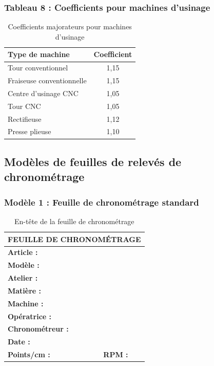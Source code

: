 \documentclass[a4paper,12pt]{article}
\begin{document}
\subsubsection{Tableau 8 : Coefficients pour machines d'usinage}

\begin{table}[ht]
\centering
\begin{tabular}{|l|c|}
\hline
\textbf{Type de machine} & \textbf{Coefficient} \\
\hline
Tour conventionnel & 1,15 \\
Fraiseuse conventionnelle & 1,15 \\
Centre d'usinage CNC & 1,05 \\
Tour CNC & 1,05 \\
Rectifieuse & 1,12 \\
Presse plieuse & 1,10 \\
\hline
\end{tabular}
\caption{Coefficients majorateurs pour machines d'usinage}
\end{table}

\subsection{Modèles de feuilles de relevés de chronométrage}

\subsubsection{Modèle 1 : Feuille de chronométrage standard}

\begin{table}[ht]
\centering
\begin{tabular}{|l|l|}
\hline
\multicolumn{2}{|c|}{\textbf{FEUILLE DE CHRONOMÉTRAGE}} \\
\hline
\textbf{Article :} & \\
\textbf{Modèle :} & \\
\textbf{Atelier :} & \\
\textbf{Matière :} & \\
\textbf{Machine :} & \\
\textbf{Opératrice :} & \\
\textbf{Chronométreur :} & \\
\textbf{Date :} & \\
\textbf{Points/cm :} & \textbf{RPM :} \\
\hline
\end{tabular}
\caption{En-tête de la feuille de chronométrage}
\end{table}
\end{document}
